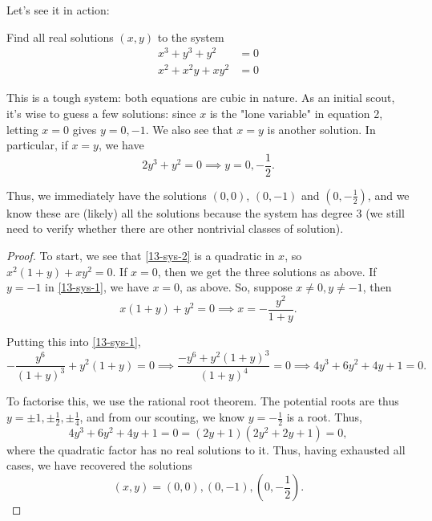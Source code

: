 \documentclass[../main.tex]{subfiles}
\begin{document}
Let's see it in action:
\begin{example}[2021 SMO(S) P22]
Find all real solutions $(x,y)$ to the system
\begin{align}
    x^3+y^3+y^2&=0 \label{13-sys-1} \\
    x^2+x^2y+xy^2&=0 \label{13-sys-2}
\end{align}
\end{example}
This is a tough system: both equations are cubic in nature. As an initial scout, it's wise to guess a few solutions: since $x$ is the "lone variable" in equation 2, letting $x=0$ gives $y=0, -1$. We also see that $x=y$ is another solution. In particular, if $x=y$, we have $$2y^3+y^2=0 \implies y=0, -\frac{1}{2}.$$

Thus, we immediately have the solutions $(0,0)$, $(0,-1)$ and $(0, -\frac{1}{2})$, and we know these are (likely) all the solutions because the system has degree 3 (we still need to verify whether there are other nontrivial classes of solution).

\begin{proof}
    To start, we see that \eqref{13-sys-2} is a quadratic in $x$, so $x^2(1+y)+xy^2=0.$ If $x=0$, then we get the three solutions as above. If $y=-1$ in \eqref{13-sys-1}, we have $x=0$, as above. So, suppose $x\neq 0, y\neq -1$, then
$$x(1+y)+y^2=0 \implies x=-\frac{y^2}{1+y}.$$

Putting this into \eqref{13-sys-1}, 
$$-\frac{y^6}{(1+y)^3}+y^2(1+y)=0 \implies \frac{-y^6+y^2(1+y)^3}{(1+y)^4}=0 \implies 4y^3+6y^2+4y+1=0.$$

To factorise this, we use the rational root theorem. The potential roots are thus $y=\pm 1, \pm \frac{1}{2}, \pm\frac{1}{4}$, and from our scouting, we know $y=-\frac{1}{2}$ is a root. Thus,
$$4y^3+6y^2+4y+1=0=(2y+1)(2y^2+2y+1)=0,$$
where the quadratic factor has no real solutions to it. Thus, having exhausted all cases, we have recovered the solutions
$$\boxed{(x,y)=(0,0), (0,-1), (0,-\frac{1}{2})}.$$
\end{proof}
\end{document}
